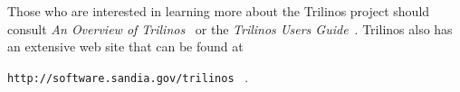 \documentclass[12pt,relax]{article}
\newcommand{\InlineDirectory}[1]{
  {\hspace{0.01 in}} {\tt #1} {\hspace{0.01 in}}}
\begin{document}
\clearpage


Those who are interested in learning more about the Trilinos project should 
consult {\it An Overview of Trilinos}~\cite{Trilinos-Overview} or the
{\it Trilinos Users Guide}~\cite{Trilinos-Users-Guide}.  Trilinos also has an 
extensive web site that can be found at \newline
\InlineDirectory{http://software.sandia.gov/trilinos}~\cite{Trilinos-home-page}.

\clearpage



%

\end{document}
